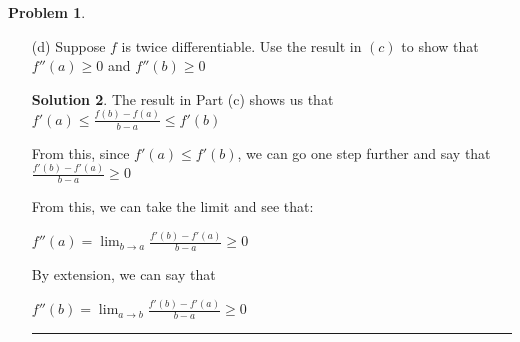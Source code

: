 \documentclass{article}
\theoremstyle{definition}
\newtheorem{problem}{Problem}
\def\fline{\rule{0.75\linewidth}{0.5pt}}
\newcommand{\finishline}{\begin{center}\fline\end{center}}
\newtheorem*{solution*}{Solution}
\newenvironment{solution}{\begin{solution*}}{{\finishline} \end{solution*}}
\begin{document}
\begin{problem}
\begin{enumerate}
\begin{solution}
                    $f'(a) \leq \frac{f(x) - f(a)}{x - a}  \leq \frac{f(b) - f(a)}{b - a} \leq \frac{f(b) - f(x)}{b - x} \leq f'(b)$ \newline 

                    $f'(a) \leq \frac{f(b) - f(a)}{b - a} \leq  f'(b)$ \newline 
                \end{solution}

        \item[(d)] Suppose $f$ is twice differentiable. Use the result in $(c)$ to show that $f''(a) \geq 0$ and $f''(b) \geq 0$

            \begin{solution}
                The result in Part (c) shows us that $f'(a) \leq  \frac{f(b) - f(a)}{b - a} \leq f'(b)$ \newline 

                From this, since $f'(a) \leq f'(b)$, we can go one step further and say that $\frac{f'(b) - f'(a)}{b - a} \geq 0$ \newline 

                From this, we can take the limit and see that: 

                $f''(a) = \lim_{b\to a} \frac{f'(b) - f'(a)}{b - a} \geq 0$ \newline 

                By extension, we can say that

                $f''(b) = \lim_{a\to b} \frac{f'(b) - f'(a)}{b - a} \geq 0$
                
                
                
            \end{solution}
    \end{enumerate}
\end{problem}
\end{document}
